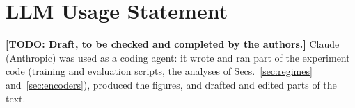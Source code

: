 \documentclass[10pt,twocolumn,letterpaper]{article}
\newcommand{\TODO}[1]{\textbf{\color{red}[TODO: #1]}}
\begin{document}
\section*{LLM Usage Statement}
\TODO{Draft, to be checked and completed by the authors.} Claude (Anthropic) was used as a coding agent: it wrote and ran part of the experiment code (training and evaluation scripts, the analyses of Secs.~\ref{sec:regimes} and~\ref{sec:encoders}), produced the figures, and drafted and edited parts of the text.

{
    \small
    
    
}
\end{document}
